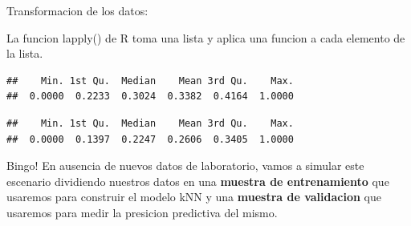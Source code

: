 \documentclass[ignorenonframetext,]{beamer}
\newenvironment{Shaded}{\begin{snugshade}}{\end{snugshade}}
\newcommand{\KeywordTok}[1]{\textcolor[rgb]{0.13,0.29,0.53}{\textbf{#1}}}
\newcommand{\DecValTok}[1]{\textcolor[rgb]{0.00,0.00,0.81}{#1}}
\newcommand{\StringTok}[1]{\textcolor[rgb]{0.31,0.60,0.02}{#1}}
\newcommand{\OperatorTok}[1]{\textcolor[rgb]{0.81,0.36,0.00}{\textbf{#1}}}
\newcommand{\NormalTok}[1]{#1}
\begin{document}
\begin{frame}[fragile]

\begin{block}{Transformacion de los datos:}

La funcion lapply() de R toma una lista y aplica una funcion a cada
elemento de la lista.

\begin{Shaded}
\end{Shaded}

\begin{verbatim}
##    Min. 1st Qu.  Median    Mean 3rd Qu.    Max. 
##  0.0000  0.2233  0.3024  0.3382  0.4164  1.0000
\end{verbatim}

\begin{Shaded}
\end{Shaded}

\begin{verbatim}
##    Min. 1st Qu.  Median    Mean 3rd Qu.    Max. 
##  0.0000  0.1397  0.2247  0.2606  0.3405  1.0000
\end{verbatim}

Bingo! En ausencia de nuevos datos de laboratorio, vamos a simular este
escenario dividiendo nuestros datos en una \textbf{muestra de
entrenamiento} que usaremos para construir el modelo kNN y una
\textbf{muestra de validacion} que usaremos para medir la presicion
predictiva del mismo.

\end{block}

\end{frame}
\end{document}
